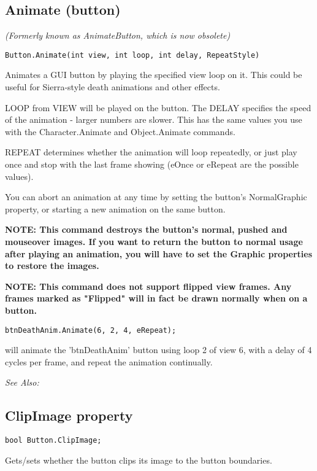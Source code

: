 \subsection{Animate (button)}\label{Button.Animate}%

\it{(Formerly known as AnimateButton, which is now obsolete)}

\begin{verbatim}
Button.Animate(int view, int loop, int delay, RepeatStyle)
\end{verbatim}
Animates a GUI button by playing the specified view loop on it. This could be
useful for Sierra-style death animations and other effects.

LOOP from VIEW will be played on the button. The DELAY specifies the speed of
the animation - larger numbers are slower. This has the same values you use
with the Character.Animate and Object.Animate commands.

REPEAT determines whether the animation will loop repeatedly, or just play once and stop
with the last frame showing (eOnce or eRepeat are the possible values).

You can abort an animation at any time by setting the button's NormalGraphic property, or
starting a new animation on the same button.

\bf{NOTE:} This command destroys the button's normal, pushed and mouseover images. If you
want to return the button to normal usage after playing an animation, you will have to set
the Graphic properties to restore the images.

\bf{NOTE:} This command does not support flipped view frames. Any frames marked as "Flipped"
will in fact be drawn normally when on a button.

\begin{verbatim}
btnDeathAnim.Animate(6, 2, 4, eRepeat);
\end{verbatim}
will animate the 'btnDeathAnim' button using loop 2 of view 6, with a delay of 4
cycles per frame, and repeat the animation continually.

\it{See Also:} 


\subsection{ClipImage property}\label{Button.ClipImage}%

\begin{verbatim}
bool Button.ClipImage;
\end{verbatim}
Gets/sets whether the button clips its image to the button boundaries.

